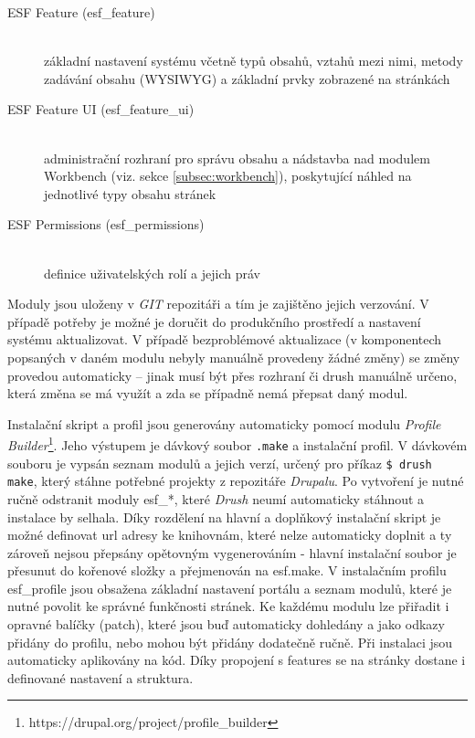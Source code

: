 \begin{description}
  \item[ESF Feature (esf\_feature)] \hfill \\ 
  základní nastavení systému včetně typů obsahů, vztahů mezi nimi, metody zadávání obsahu (WYSIWYG) a základní prvky zobrazené na stránkách
  \item[ESF Feature UI (esf\_feature\_ui)] \hfill \\ 
  administrační rozhraní pro správu obsahu a nádstavba nad modulem Workbench (viz. sekce \ref{subsec:workbench}), poskytující náhled na jednotlivé typy obsahu stránek
  \item[ESF Permissions (esf\_permissions)] \hfill \\ 
  definice uživatelských rolí a jejich práv
\end{description}

Moduly jsou uloženy v \emph{GIT} repozitáři a tím je zajištěno jejich verzování. V případě potřeby je možné je doručit do produkčního prostředí a nastavení systému aktualizovat. V případě bezproblémové aktualizace (v komponentech popsaných v daném modulu nebyly manuálně provedeny žádné změny) se změny provedou automaticky – jinak musí být přes rozhraní či drush manuálně určeno, která změna se má využít a zda se případně nemá přepsat daný modul.

Instalační skript a profil jsou generovány automaticky pomocí modulu \emph{Profile Builder}\footnote{https://drupal.org/project/profile\_builder}. Jeho výstupem je dávkový soubor \texttt{.make} a instalační profil. V dávkovém souboru je vypsán seznam modulů a jejich verzí, určený pro příkaz \texttt{\$ drush make}, který stáhne potřebné projekty z repozitáře \emph{Drupalu}. Po vytvoření je nutné ručně odstranit moduly esf\_*, které \emph{Drush} neumí automaticky stáhnout a instalace by selhala. Díky rozdělení na hlavní a doplňkový instalační skript je možné definovat url adresy ke knihovnám, které nelze automaticky doplnit a ty zároveň nejsou přepsány opětovným vygenerováním - hlavní instalační soubor je přesunut do kořenové složky a přejmenován na esf.make. V instalačním profilu esf\_profile jsou obsažena základní nastavení portálu a seznam modulů, které je nutné povolit ke správné funkčnosti stránek. Ke každému modulu lze přiřadit i opravné balíčky (patch), které jsou buď automaticky dohledány a jako odkazy přidány do profilu, nebo mohou být přidány dodatečně ručně. Při instalaci jsou automaticky aplikovány na kód. Díky propojení s features se na stránky dostane i definované nastavení a struktura.

